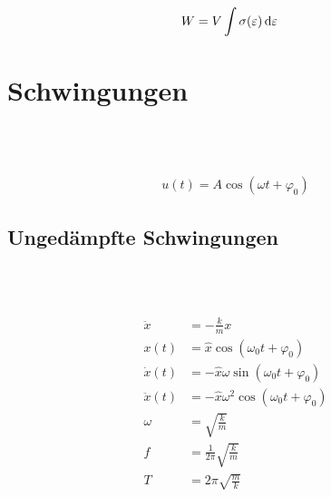 \begin{boxleft}
\end{boxleft}\begin{boxrightshaded}
\begin{align}
W&=V\int \sigma(\varepsilon) \mathop{}\!\mathrm{d} \varepsilon 
\end{align}
\end{boxrightshaded}

\section{Schwingungen}


\begin{boxleft}
\\
\\
\end{boxleft}\begin{boxrightshaded}
\begin{align}
u(t)=A\cos(\omega t+\varphi_0)
\end{align}
\end{boxrightshaded}

\subsection{Ungedämpfte Schwingungen}

\begin{boxleft}
\\
\\
\end{boxleft}\begin{boxrightshaded}
\begin{align}
\ddot{x}&=-\frac{k}{m}x\\
x(t)&=\hat{x}\cos(\omega_0 t+\varphi_0)\\
\dot{x}(t)&=-\hat{x}\omega\sin(\omega_0 t+\varphi_0)\\
\ddot{x}(t)&=-\hat{x}\omega^2\cos(\omega_0 t+\varphi_0)\\
\omega&=\sqrt{\frac{k}{m}}\\
f&=\frac{1}{2\pi}\sqrt{\frac{k}{m}}\\
T&=2\pi\sqrt{\frac{m}{k}}
\end{align}
\end{boxrightshaded}

